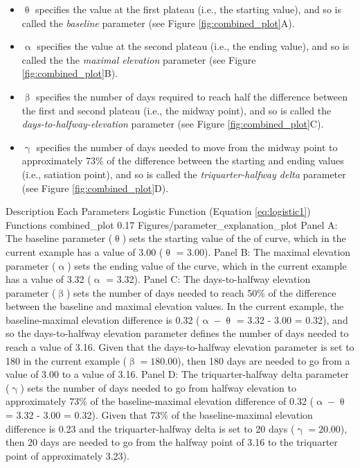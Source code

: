 \documentclass[
12pt, %
twoside,
english]{guelphthesis}
\begin{document}
\begin{itemize}
\tightlist
\item
  \(\uptheta\) specifies the value at the first plateau (i.e., the starting value), and so is called the \emph{baseline} parameter (see Figure \ref{fig:combined_plot}A).
\item
  \(\upalpha\) specifies the value at the second plateau (i.e., the ending value), and so is called the the \emph{maximal elevation} parameter (see Figure \ref{fig:combined_plot}B).
\item
  \(\upbeta\) specifies the number of days required to reach half the difference between the first and second plateau (i.e., the midway point), and so is called the \emph{days-to-halfway-elevation} parameter (see Figure \ref{fig:combined_plot}C).
\item
  \(\upgamma\) specifies the number of days needed to move from the midway point to approximately 73\% of the difference between the starting and ending values (i.e., satiation point), and so is called the \emph{triquarter-halfway delta} parameter (see Figure \ref{fig:combined_plot}D).
\end{itemize}
\begin{apaFigure}
[landscape]
[samepage]
[0cm]
{Description Each Parameters Logistic Function (Equation \ref{eq:logistic1}) Functions}
{combined_plot}
{0.17}
{Figures/parameter_explanation_plot}
{Panel A: The baseline parameter ($\uptheta$) sets the starting value of the of curve, which in the current example has a value of 3.00 ($\uptheta$ = 3.00). Panel B: The maximal elevation parameter ($\upalpha$) sets the ending value of the curve, which in the current example has a value of 3.32 ($\upalpha$ = 3.32). Panel C: The days-to-halfway elevation parameter ($\upbeta$) sets the number of days needed to reach 50\% of the difference between the baseline and maximal elevation values. In the current example, the baseline-maximal elevation difference is 0.32 ($\upalpha - \uptheta$ = 3.32 - 3.00 = 0.32), and so the days-to-halfway elevation parameter defines the number of days needed to reach a value of 3.16. Given that the days-to-halfway elevation parameter is set to 180 in the current example ($\upbeta = 180.00$), then 180 days are needed to go from a value of 3.00 to a value of 3.16. Panel D: The triquarter-halfway delta parameter ($\upgamma$) sets the number of days needed to go from halfway elevation to approximately 73\% of the baseline-maximal elevation difference of 0.32 ($\upalpha - \uptheta$ = 3.32 - 3.00 = 0.32). Given that 73\% of the baseline-maximal elevation difference is 0.23 and the triquarter-halfway delta is set to 20 days ($\upgamma = 20.00$), then 20 days are needed to go from the halfway point of 3.16 to the triquarter point of approximately 3.23).}
\end{apaFigure}
\end{document}
